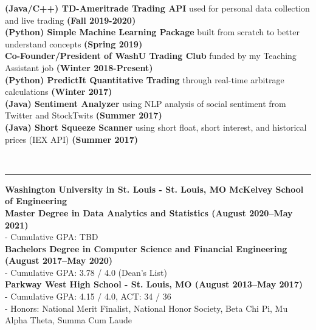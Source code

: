 \documentclass[11pt]{article}
\begin{document}
\begin{titlepage}
		\begin{addmargin}[1em]{0em}
    		\textbf{(Java/C++) TD-Ameritrade Trading API} used for personal data collection and live trading \textbf{ \hfill (Fall 2019-2020)}\\
			\textbf{(Python) Simple Machine Learning Package} built from scratch to better understand concepts \textbf{ \hfill (Spring 2019)}\\
			\textbf{Co-Founder/President of WashU Trading Club} funded by my Teaching Assistant job \textbf{\hfill (Winter 2018-Present)}\\
			\textbf{(Python) PredictIt Quantitative Trading} through real-time arbitrage calculations \textbf{\hfill (Winter 2017)}\\
            \textbf{(Java) Sentiment Analyzer} using NLP analysis of social sentiment from Twitter and StockTwits \textbf{\hfill (Summer 2017)}\\	
			\textbf{(Java) Short Squeeze Scanner} using short float, short interest, and historical prices (IEX API) \textbf{\hfill (Summer 2017)}\\
		\end{addmargin}
		\vspace{-10pt}
		\noindent
		\\\rule{\textwidth}{0.4pt}
		\begin{addmargin}[1em]{0em}
			\textbf{Washington University in St. Louis - St. Louis, MO \hfill McKelvey School of Engineering}\\
			\textbf{Master  Degree in Data Analytics and Statistics \hfill (August 2020–May 2021)}\\
				- Cumulative GPA: TBD\\
			\textbf{Bachelors Degree in Computer Science and Financial Engineering \hfill (August 2017–May 2020)}\\
				- Cumulative GPA: 3.78 / 4.0 (Dean's List)\\
			\textbf{Parkway West High School - St. Louis, MO \hfill (August 2013–May 2017)}\\
				- Cumulative GPA: 4.15 / 4.0, ACT: 34 / 36\\
				- Honors: National Merit Finalist, National Honor Society, Beta Chi Pi, Mu Alpha Theta, Summa Cum Laude \\
		\end{addmargin}
	\end{titlepage}
\end{document}
